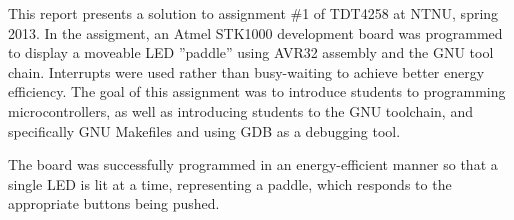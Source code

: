 This report presents a solution to assignment \#1 of TDT4258 at NTNU, spring 2013.
In the assigment, an Atmel STK1000 development board was programmed to display a moveable LED ''paddle'' using AVR32 assembly and the GNU tool chain.
Interrupts were used rather than busy-waiting to achieve better energy efficiency.
The goal of this assignment was to introduce students to programming microcontrollers, as well as introducing students to the GNU toolchain, and specifically GNU Makefiles and using GDB as a debugging tool.

The board was successfully programmed in an energy-efficient manner so that a single LED is lit at a time, representing a paddle, which responds to the appropriate buttons being pushed.

